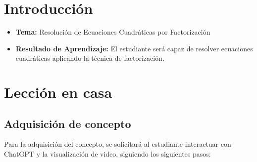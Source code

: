 \documentclass[a4,11pt]{aleph-notas}
\begin{document}
\encabezado

\section*{Introducción}

\begin{itemize}
    \item \textbf{Tema:} Resolución de Ecuaciones Cuadráticas por Factorización
    \item \textbf{Resultado de Aprendizaje:} El estudiante será capaz de resolver ecuaciones cuadráticas aplicando la técnica de factorización.
\end{itemize}

\section{Lección en casa}

\subsection{Adquisición de concepto}

Para la adquisición del concepto, se solicitará al estudiante interactuar con ChatGPT y la visualización de video, siguiendo los siguientes pasos:
\end{document}
